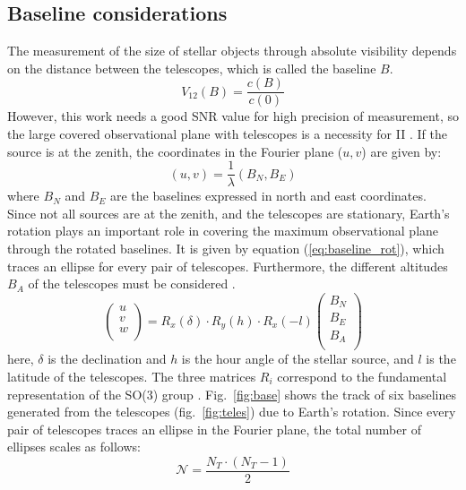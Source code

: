 \subsection{Baseline considerations}
The measurement of the size of stellar objects through absolute visibility depends on the distance between the telescopes, which is called the baseline $B$. 
\begin{equation}
	V_{12}(B) = \frac{c(B)}{c(0)}
	\label{eq:angular_size_meas}
\end{equation}
However, this work needs a good SNR value for high precision of measurement, so the large covered observational plane with telescopes is a necessity for II \cite{acciari2020optical, abeysekara2020demonstration}. If the source is at the zenith, the coordinates in the Fourier plane ($u,v$) are given by:
\begin{equation}
	(u,v) = \frac{1}{\lambda} (B_N, B_E)
\end{equation}
where $B_N$ and $B_E$ are the baselines expressed in north and east coordinates. Since not all sources are at the zenith, and the telescopes are stationary, Earth's rotation plays an important role in covering the maximum observational plane through the rotated baselines. It is given by equation (\ref{eq:baseline_rot}), which traces an ellipse for every pair of telescopes. Furthermore, the different altitudes $B_A$ of the telescopes must be considered \cite{dravins2013optical, saha2020theory}.  
\begin{equation}
	\begin{pmatrix} u\\ v\\ w\\ \end{pmatrix} = R_x(\delta) \cdot R_y(h) \cdot R_x(-l) \begin{pmatrix} B_N\\ B_E\\ B_A\\ \end{pmatrix}
	\label{eq:baseline_rot}
\end{equation}
here, $\delta$ is the declination and $h$ is the hour angle of the stellar source, and $l$ is the latitude of the telescopes. The three matrices $R_i$ correspond to the fundamental representation of the SO(3) group \cite{saha2020theory}. Fig.~\ref{fig:base} shows the track of six baselines generated from the telescopes (fig.~\ref{fig:teles}) due to Earth's rotation. Since every pair of telescopes traces an ellipse in the Fourier plane, the total number of ellipses scales as follows:
\begin{equation}
	\label{eq:N_telescopes}
	\mathcal{N} = \frac{N_T \cdot (N_T -1)}{2}
\end{equation}

